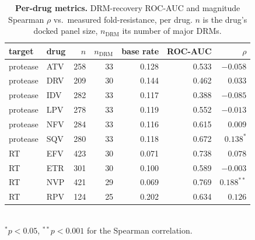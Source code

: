 \documentclass{article}
\newcommand{\rhoo}{\ensuremath{\rho}}
\begin{document}
\begin{table}[h]
\centering
\caption{\textbf{Per-drug metrics.} DRM-recovery ROC-AUC and magnitude Spearman \rhoo{} vs.\ measured fold-resistance, per drug. $n$ is the drug's docked panel size, $n_{\text{DRM}}$ its number of major DRMs.}
\label{tab:perdrug}
\begin{tabular}{llrrrrr}
\toprule
target & drug & $n$ & $n_{\text{DRM}}$ & base rate & ROC-AUC & \rhoo{} \\
\midrule
protease & ATV & 258 & 33 & 0.128 & 0.533 & $-0.058$ \\
protease & DRV & 209 & 30 & 0.144 & 0.462 & $0.033$ \\
protease & IDV & 282 & 33 & 0.117 & 0.388 & $-0.085$ \\
protease & LPV & 278 & 33 & 0.119 & 0.552 & $-0.013$ \\
protease & NFV & 284 & 33 & 0.116 & 0.615 & $0.009$ \\
protease & SQV & 280 & 33 & 0.118 & 0.672 & $0.138^{*}$ \\
\midrule
RT & EFV & 423 & 30 & 0.071 & 0.738 & $0.078$ \\
RT & ETR & 301 & 30 & 0.100 & 0.589 & $-0.003$ \\
RT & NVP & 421 & 29 & 0.069 & 0.769 & $0.188^{**}$ \\
RT & RPV & 124 & 25 & 0.202 & 0.634 & $0.126$ \\
\bottomrule
\end{tabular}
\\[2pt]
{\footnotesize $^{*}p<0.05$, $^{**}p<0.001$ for the Spearman correlation.}
\end{table}
\end{document}
